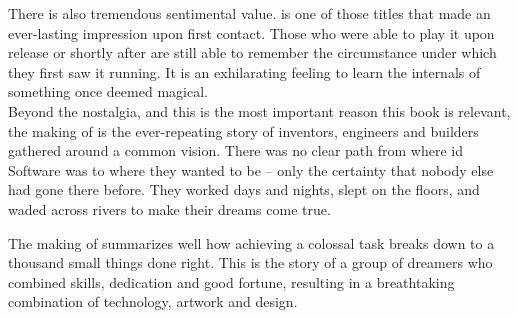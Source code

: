  \par

There is also tremendous sentimental value. \doom{} is one of those titles that made an ever-lasting impression upon first contact. Those who were able to play it upon release or shortly after are still able to remember the circumstance under which they first saw it running. It is an exhilarating feeling to learn the internals of something once deemed magical.\\


Beyond the nostalgia, and this is the most important reason this book is relevant, the making of \doom{} is the ever-repeating story of inventors, engineers and builders gathered around a common vision. There was no clear path from where id Software was to where they wanted to be -- only the certainty that nobody else had gone there before. They worked days and nights, slept on the floors, and waded across rivers to make their dreams come true.\\
\par
 The making of \doom{} summarizes well how achieving a colossal task breaks down to a thousand small things done right. This is the story of a group of dreamers who combined skills, dedication and good fortune, resulting in a breathtaking combination of technology, artwork and design.\\
\par



